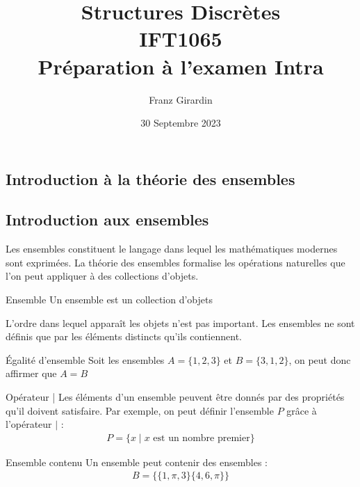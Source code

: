 \documentclass[8pt]{report}
\title{\Huge{Structures Discrètes}\\{IFT1065}\\{\textbf{Préparation à l'examen Intra}}}
\author{\huge{Franz Girardin}}
\date{30 Septembre 2023}
\begin{document}
\maketitle
\pagebreak
\tableofcontents
\pagebreak









\begin{multicols*}{2}
\chapter{Introduction à la théorie des ensembles}
\section{Introduction aux ensembles}

Les ensembles constituent le langage dans lequel les mathématiques modernes sont exprimées. La théorie des 
ensembles formalise les opérations naturelles que l'on peut appliquer à des collections d'objets. 
\begin{Definition}{Ensemble}{}
    Un ensemble est un collection d'objets
\end{Definition}
\begin{Remarque}{}{}
  L'ordre dans lequel apparaît les objets n'est pas important. Les ensembles ne sont définis que par 
  les éléments distincts qu'ils contiennent. 
\end{Remarque}

\begin{EExample}{Égalité d'ensemble}{}
  Soit les ensembles $A = \{ 1, 2, 3 \}$ et $B = \{ 3, 1, 2 \}$, on peut donc affirmer que $A = B$ 
\end{EExample}
\begin{Syntaxe*}{Opérateur |}{}
  Les éléments d'un ensemble peuvent être donnés par des propriétés qu'il doivent satisfaire. Par exemple,
  on peut définir l'ensemble $P$ grâce à l'opérateur $|$ : 
  \begin{align*}
      P = \{ x \; | \; x \text{ est un nombre premier}  \}
  \end{align*}
\end{Syntaxe*}
\begin{Remarque}{Ensemble contenu}{}
    Un ensemble peut contenir des ensembles : 
    \begin{align}
      B = \{ \{1, \pi, 3 \} \{4, 6, \pi\}\}
    \end{align}


\end{Remarque}
\end{multicols*}
\end{document}
